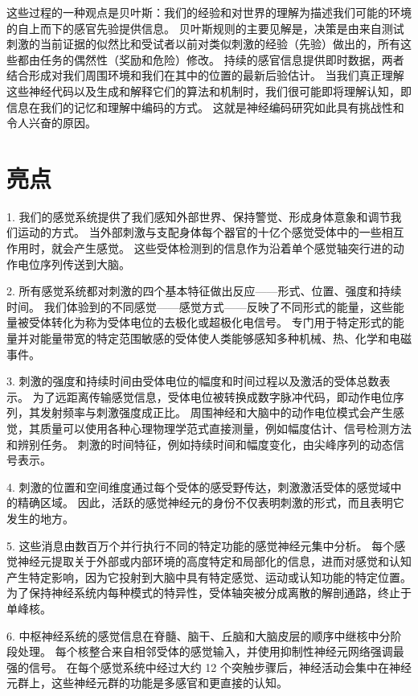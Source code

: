 这些过程的一种观点是贝叶斯：我们的经验和对世界的理解为描述我们可能的环境的自上而下的感官先验提供信息。 
贝叶斯规则的主要见解是，决策是由来自测试刺激的当前证据的似然比和受试者以前对类似刺激的经验（先验）做出的，所有这些都由任务的偶然性（奖励和危险）修改。 
持续的感官信息提供即时数据，两者结合形成对我们周围环境和我们在其中的位置的最新后验估计。 
当我们真正理解这些神经代码以及生成和解释它们的算法和机制时，我们很可能即将理解认知，即信息在我们的记忆和理解中编码的方式。 
这就是神经编码研究如此具有挑战性和令人兴奋的原因。



\section{亮点}

1. 我们的感觉系统提供了我们感知外部世界、保持警觉、形成身体意象和调节我们运动的方式。 当外部刺激与支配身体每个器官的十亿个感觉受体中的一些相互作用时，就会产生感觉。 
这些受体检测到的信息作为沿着单个感觉轴突行进的动作电位序列传送到大脑。 

2. 所有感觉系统都对刺激的四个基本特征做出反应——形式、位置、强度和持续时间。 
我们体验到的不同感觉——感觉方式——反映了不同形式的能量，这些能量被受体转化为称为受体电位的去极化或超极化电信号。 
专门用于特定形式的能量并对能量带宽的特定范围敏感的受体使人类能够感知多种机械、热、化学和电磁事件。 


3. 刺激的强度和持续时间由受体电位的幅度和时间过程以及激活的受体总数表示。 
为了远距离传输感觉信息，受体电位被转换成数字脉冲代码，即动作电位序列，其发射频率与刺激强度成正比。 
周围神经和大脑中的动作电位模式会产生感觉，其质量可以使用各种心理物理学范式直接测量，例如幅度估计、信号检测方法和辨别任务。 
刺激的时间特征，例如持续时间和幅度变化，由尖峰序列的动态信号表示。 

4. 刺激的位置和空间维度通过每个受体的感受野传达，刺激激活受体的感觉域中的精确区域。 
因此，活跃的感觉神经元的身份不仅表明刺激的形式，而且表明它发生的地方。 


5. 这些消息由数百万个并行执行不同的特定功能的感觉神经元集中分析。 
每个感觉神经元提取关于外部或内部环境的高度特定和局部化的信息，进而对感觉和认知产生特定影响，因为它投射到大脑中具有特定感觉、运动或认知功能的特定位置。 
为了保持神经系统内每种模式的特异性，受体轴突被分成离散的解剖通路，终止于单峰核。 


6. 中枢神经系统的感觉信息在脊髓、脑干、丘脑和大脑皮层的顺序中继核中分阶段处理。 
每个核整合来自相邻受体的感觉输入，并使用抑制性神经元网络强调最强的信号。 
在每个感觉系统中经过大约 12 个突触步骤后，神经活动会集中在神经元群上，这些神经元群的功能是多感官和更直接的认知。 


